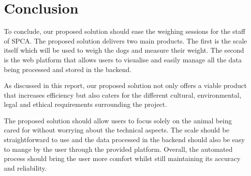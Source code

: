 
\chapter{Conclusion}

To conclude, our proposed solution should ease the weighing sessions for the staff of SPCA. The proposed solution delivers two main products. The first is the scale itself which will be used to weigh the dogs and measure their weight.  The second is the web platform that allows users to visualise and easily manage all the data being processed and stored in the backend.

As discussed in this report, our proposed solution not only offers a viable product that increases efficiency but also caters for the different cultural, environmental, legal and ethical requirements surrounding the project. 

The proposed solution should allow users to focus solely on the animal being cared for without worrying about the technical aspects. The scale should be straightforward to use and the data processed in the backend should also be easy to mange by the user through the provided platform. Overall, the automated process should bring the user more comfort whilst still maintaining its accuracy and reliability.